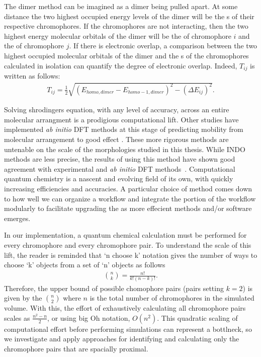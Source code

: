 The dimer method can be imagined as a dimer being pulled apart. At some distance
the two highest occupied energy levels of the dimer will 
be the s of their respective chromophores. 
If the chromophores are not interacting, 
then the two highest energy molecular orbitals of the dimer will be the  of chromophore $i$ and the 
 of chromophore $j$. If there is electronic overlap, a
comparison between the two highest occupied
molecular orbitals of the dimer and the s of the chromophores calculated in isolation can quantify the degree of
electronic overlap. Indeed, $T_{ij}$ is written as follows:
\begin{align}
    T_{ij} = \frac{1}{2}\sqrt{ (E_{homo,dimer} - E_{homo-1,dimer})^{2} - (\Delta E_{ij})^{2} }.
\end{align}
 
Solving shrodingers equation, with any level of accuracy,
across an entire molecular arrangment is a prodigious computational lift.
Other studies have implemented \textit{ab initio} DFT methods at this stage of predicting
mobility from molecular arrangement to good effect \cite{Deng2004}. These more
rigorous methods are
untenable on the scale of the morphologies studied in this thesis. While INDO methods are less precise, 
the results of using this method have shown good agreement with experimental and \textit{ab initio}
DFT methods~\cite{Bredas2002}. 
Computational quantum chemistry is a nascent and evolving field of its
own, with quickly increasing efficiencies and accuracies.
A particular 
choice of method comes down to how well we can organize a workflow and integrate the  portion of the
workflow modularly to facilitate upgrading the  as more effecient methods and/or software emerges.

In our implementation, a quantum chemical calculation must be performed for every chromophore and every chromophore pair. 
To understand the scale of this lift, the reader is reminded that
`n choose k' notation gives the number of ways to choose `k' objects from a set of 
`n' objects as follows 
\begin{align}
    {n \choose k} =  \frac{n!}{k!(n-k)!}.
\end{align}
Therefore, the upper bound of possible chomophore pairs (pairs setting $k=2$) is given by the 
$n \choose 2$ where $n$ is the total number of chromophores in the simulated volume. 
With this, the effort of exhaustively calculating all chromophore pairs scales as $\frac{n^{2} - n}{2}$, or using big Oh notation, $O(n^2)$.
This quadratic scaling of computational effort before performing  simulations can represent a bottlneck, so
we investigate and apply approaches for identifying and calculating only the chromophore pairs that are
spacially proximal.

